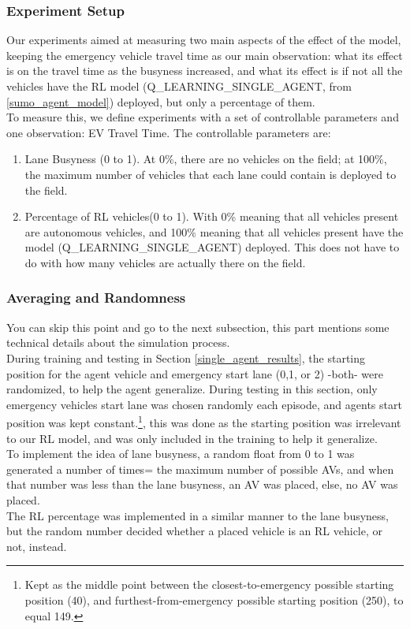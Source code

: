 \subsubsection{Experiment Setup}
Our experiments aimed at measuring two main aspects of the effect of the model, keeping the emergency vehicle travel time as our main observation: what its effect is on the travel time as the busyness increased, and what its effect is if not all the vehicles have the RL model (Q\_LEARNING\_SINGLE\_AGENT, from \ref{sumo_agent_model}) deployed, but only a percentage of them. \\

To measure this, we define experiments with a set of controllable parameters and one observation: EV Travel Time. The controllable parameters are:
\begin{enumerate}
    \item Lane Busyness (0 to 1). At 0\%, there are no vehicles on the field; at 100\%, the maximum number of vehicles that each lane could contain is deployed  to the field.
    \item Percentage of RL vehicles(0 to 1). With 0\% meaning that all vehicles present are autonomous vehicles, and 100\% meaning that all vehicles present have the model (Q\_LEARNING\_SINGLE\_AGENT) deployed. This does not have to do with how many vehicles are actually there on the field.
\end{enumerate}

\subsubsection{Averaging and Randomness}
You can skip this point and go to the next subsection, this part mentions some technical details about the simulation process. \\ 

During training and testing in Section \ref{single_agent_results}, the starting position for the agent vehicle and emergency start lane (0,1, or 2) -both- were randomized, to help the agent generalize. During testing in this section, only emergency vehicles start lane was chosen randomly each episode, and agents start position was kept constant.\footnote{Kept as the middle point between the closest-to-emergency possible starting position (40), and furthest-from-emergency possible starting position (250), to equal 149.}, this was done as the starting position was irrelevant to our RL model, and was only included in the training to help it generalize.  \\
To implement the idea of lane busyness, a random float from 0 to 1 was generated a number of times= the maximum number of possible AVs, and when that number was less than the lane busyness, an AV was placed, else, no AV was placed. \\
The RL percentage was implemented in a similar manner to the lane busyness, but the random number decided whether a placed vehicle is an RL vehicle, or not, instead.\\

